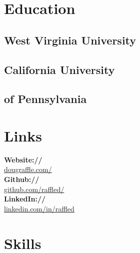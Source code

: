 \documentclass[letterpaper]{deedy-resume} %
\begin{document}
\lastupdated %


\begin{minipage}[t]{0.3\textwidth} %
	\section{Education} 
		\subsection{West Virginia University}
		\sectionspace
		
		\subsection{California University}
		\subsection{of Pennsylvania}
	\vspace{20pt}
	
	\section{Links} 
		{\bf Website://}\\ \href{http://www.dougraffle.com/}{dougraffle.com/}\\
		{\bf Github://}\\ \href{http://github.com/raffled/}{github.com/raffled/}\\
		{\bf LinkedIn://}\\ \href{https://www.linkedin.com/in/raffled}{linkedin.com/in/raffled} \\
	\vspace{20pt}
	
	\section{Skills}

\end{minipage}
\end{document}
